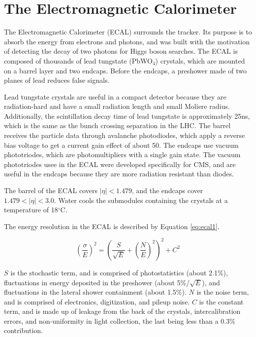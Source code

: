 \vspace{-3pt}
\section{The Electromagnetic Calorimeter}\label{sec:ch3:ecal}

The Electromagnetic Calorimeter (ECAL) surrounds the tracker. Its purpose is to absorb the energy from electrons and photons, and was built with the motivation of detecting the decay of two photons for Higgs boson searches. The ECAL is composed of thousands of lead tungstate (PbWO$_4$) crystals, which are mounted on a barrel layer and two endcaps. Before the endcaps, a preshower made of two planes of lead reduces false signals.

Lead tungstate crystals are useful in a compact detector because they are radiation-hard and have a small radiation length and small Moliere radius. Additionally, the scintillation decay time of lead tungstate is approximately 25ns, which is the same as the bunch crossing separation in the LHC. The barrel receives the particle data through avalanche photodiodes, which apply a reverse bias voltage to get a current gain effect of about 50. The endcaps use vacuum phototriodes, which are photomultipliers with a single gain state. The vacuum phototriodes usee in the ECAL were developed specifically for CMS, and are useful in the endcaps because they are more radiation resistant than diodes.

The barrel of the ECAL covers $|\eta| < 1.479$, and the endcaps cover $1.479 < |\eta| < 3.0 $. Water cools the submodules containing the crystals at a temperature of 18$^{\circ}$C.


The energy resolution in the ECAL is described by Equation \ref{eq:ecal1}.

\begin{equation}
\left( \frac{\sigma}{E} \right)^2 = \left( \frac{S}{\sqrt{E}} + \left( \frac{N}{E} \right)^2\right)^2 + C^2
\label{eq:ecal1}
\end{equation}

$S$ is the stochastic term, and is comprised of photostatistics (about 2.1\%), fluctuations in energy deposited in the preshower (about 5\%/$\sqrt{E}$), and fluctuations in the lateral shower containment (about 1.5\%). $N$ is the noise term, and is comprised of electronics, digitization, and pileup noise. $C$ is the constant term, and is made up of leakage from the back of the crystals, intercalibration errors, and non-uniformity in light collection, the last being less than a 0.3\% contribution.
